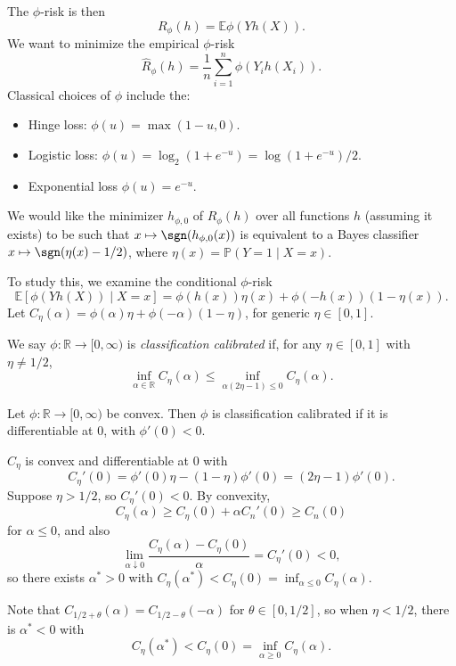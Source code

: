 \documentclass[12pt]{article}
\begin{document}

The $\phi$-risk is then
\[
R_\phi(h) = \mathbb{E} \phi(Y h(X)).
\]
We want to minimize the empirical $\phi$-risk
\[
\hat R_\phi(h) = \frac{1}{n} \sum_{i = 1}^n \phi(Y_i h (X_i)).
\]
Classical choices of $\phi$ include the:
\begin{itemize}
	\item Hinge loss: $\phi(u) = \max(1 - u, 0)$.
	\item Logistic loss: $\phi(u) = \log_2(1 + e^{-u}) = \log(1 + e^{-u})/2$.
	\item Exponential loss $\phi(u) = e^{-u}$.
\end{itemize}
We would like the minimizer $h_{\phi, 0}$ of $R_\phi(h)$ over all functions $h$ (assuming it exists) to be such that $x \mapsto \sgn(h_{\phi, 0}(x))$ is equivalent to a Bayes classifier $x \mapsto \sgn(\eta(x) - 1/2)$, where $\eta(x) = \mathbb{P}(Y = 1 \mid X = x)$.

To study this, we examine the conditional $\phi$-risk
\[
\mathbb{E}[\phi(Yh(X)) \mid X = x] = \phi(h(x))\eta(x) + \phi(-h(x))(1 - \eta(x)).
\]
Let $C_\eta(\alpha) = \phi(\alpha) \eta + \phi(-\alpha)(1 - \eta)$, for generic $\eta \in [0, 1]$.

\begin{definition}
	We say $\phi : \mathbb{R} \to [0, \infty)$ is \emph{classification calibrated} if, for any $\eta \in [0, 1]$ with $\eta \neq 1/2$,
	\[
	\inf_{\alpha \in \mathbb{R}} C_\eta(\alpha) \leq \inf_{\alpha(2\eta - 1) \leq 0} C_\eta(\alpha).
	\]
\end{definition}

\begin{theorem}
	Let $\phi : \mathbb{R} \to [0, \infty)$ be convex. Then $\phi$ is classification calibrated if it is differentiable at $0$, with $\phi'(0) < 0$.
\end{theorem}

\begin{proofbox}
	$C_\eta$ is convex and differentiable at $0$ with
	\[
	C_\eta'(0) = \phi'(0) \eta - (1 - \eta) \phi'(0) = (2\eta - 1)\phi'(0).
	\]
	Suppose $\eta > 1/2$, so $C_\eta'(0) < 0$. By convexity,
	\[
	C_\eta(\alpha) \geq C_\eta(0) + \alpha C_n'(0) \geq C_n(0)
	\]
	for $\alpha \leq 0$, and also
	\[
	\lim_{\alpha \downarrow 0} \frac{C_\eta(\alpha) - C_\eta(0)}{\alpha} = C_\eta'(0) < 0,
	\]
	so there exists $\alpha^\ast > 0$ with $C_\eta(\alpha^\ast) < C_\eta(0) = \inf_{\alpha \leq 0} C_\eta(\alpha)$.

	Note that $C_{1/2 + \theta}(\alpha) = C_{1/2 - \theta}(-\alpha)$ for $\theta \in [0, 1/2]$, so when $\eta < 1/2$, there is $\alpha^\ast < 0$ with
	\[
	C_\eta(\alpha^\ast) < C_\eta(0) = \inf_{\alpha \geq 0}C_\eta(\alpha).
	\]
\end{proofbox}
\end{document}
